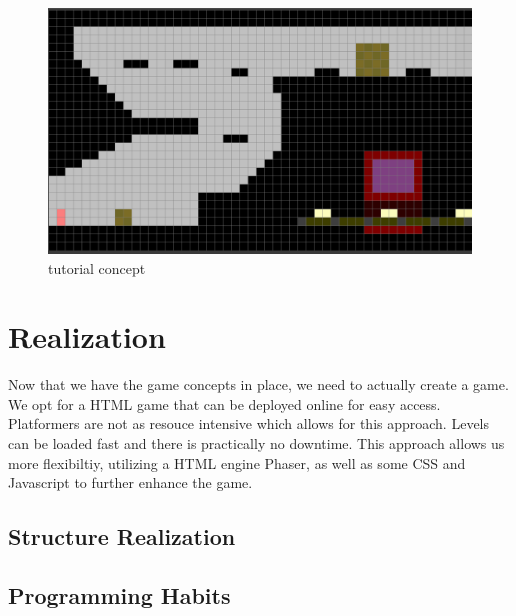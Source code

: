 \documentclass[a4paper,twoside,12pt]{article}
\begin{document}
\begin{figure}[H]
\includegraphics[scale=0.5]{level.png}
\caption{tutorial concept}
\end{figure}

\section{Realization}
Now that we have the game concepts in place, we need to actually create a game.
We opt for a HTML game that can be deployed online for easy access. Platformers are not as resouce intensive which allows for this approach. Levels can be loaded fast and there is practically no downtime. This approach allows us more flexibiltiy, utilizing a HTML engine Phaser, as well as some CSS and Javascript to further enhance the game.
\subsection{Structure Realization}



\subsection{Programming Habits}
\end{document}
